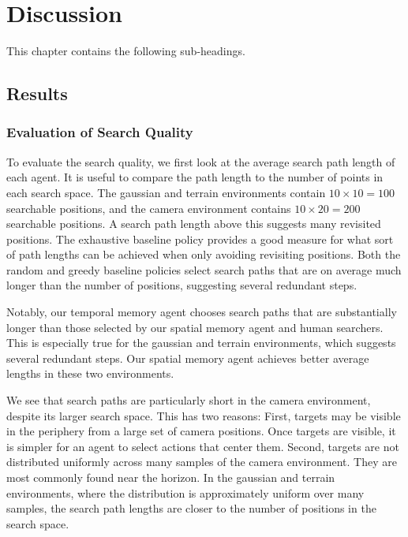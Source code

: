 \chapter{Discussion}
\label{cha:discussion}

This chapter contains the following sub-headings.

\section{Results}
\label{sec:discussion-results}


\subsection{Evaluation of Search Quality}

To evaluate the search quality, we first look at the average search path length of each agent.
It is useful to compare the path length to the number of points in each search space.
The gaussian and terrain environments contain \(10 \times 10 = 100\) searchable positions, and the camera environment contains \(10 \times 20 = 200\) searchable positions.
A search path length above this suggests many revisited positions.
The exhaustive baseline policy provides a good measure for what sort of path lengths can be achieved when only avoiding revisiting positions.
Both the random and greedy baseline policies select search paths that are on average much longer than the number of positions, suggesting several redundant steps.

Notably, our temporal memory agent chooses search paths that are substantially longer than those selected by our spatial memory agent and human searchers.
This is especially true for the gaussian and terrain environments, which suggests several redundant steps.
Our spatial memory agent achieves better average lengths in these two environments.

We see that search paths are particularly short in the camera environment,
despite its larger search space.
This has two reasons:
First, targets may be visible in the periphery from a large set of camera positions.
Once targets are visible, it is simpler for an agent to select actions that center them.
Second, targets are not distributed uniformly across many samples of the camera environment.
They are most commonly found near the horizon.
In the gaussian and terrain environments, where the distribution is approximately uniform over many samples, the search path lengths are closer to the number of positions in the search space.

